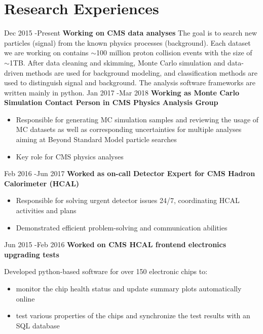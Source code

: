 \documentclass[10pt]{article} %
\begin{document}
\section{Research Experiences}
\job
{Dec 2015 -}{Present}
{\textbf{Working on CMS data analyses}}
{
The goal is to search new particles (signal) from the known physics processes (background). Each dataset we are working on contains $\sim$100 million proton collision events with the size of $\sim$1TB. After data cleaning and skimming, Monte Carlo simulation and data-driven methods are used for background modeling, and classification methods are used to distinguish signal and background. The analysis software frameworks are written mainly in python.
}
\job
{Jan 2017 -}{Mar 2018}
{\textbf{Working as Monte Carlo Simulation Contact Person in CMS Physics Analysis Group}}
{
\begin{itemize}
\item Responsible for generating MC simulation samples and reviewing the usage of MC datasets as well as corresponding uncertainties for multiple analyses aiming at Beyond Standard Model particle searches
\item Key role for CMS physics analyses
\end{itemize}}
\job
{Feb 2016 -}{Jun 2017}
{\textbf{Worked as on-call Detector Expert for CMS Hadron Calorimeter (HCAL)}}
{
\begin{itemize}
\item Responsible for solving urgent detector issues 24/7, coordinating HCAL activities and plans
\item Demonstrated efficient problem-solving and communication abilities
\end{itemize}}
\job
{Jun 2015 -}{Feb 2016}
{\textbf{Worked on CMS HCAL frontend electronics upgrading tests}}
{
Developed python-based software for over 150 electronic chips to:
\begin{itemize}
\item monitor the chip health status and update summary plots automatically online
\item test various properties of the chips and synchronize the test results with an SQL database
\end{itemize}
}
\end{document}
